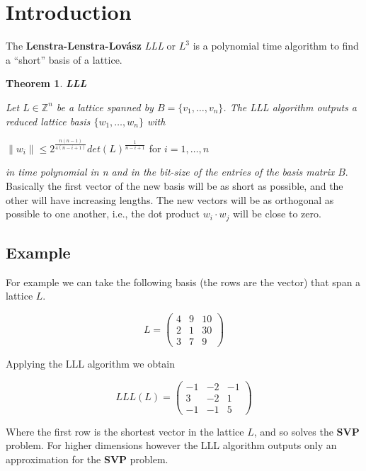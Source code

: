 \documentclass[a4paper,12pt]{report}
\newtheorem{theorem}{Theorem}[section]
\newcommand{\Z}{\mathbb{Z}}
\newcommand{\dd}{\cdot}
\begin{document}
\section{Introduction}

The \textbf{Lenstra-Lenstra-Lovász} \textit{LLL}\cite{LLL} or \textit{$L^3$} is a polynomial time algorithm to find a ``short'' basis of a lattice.

\begin{theorem}
    \textbf{LLL}
\end{theorem}

\textit{Let $L \in \Z^n$ be a lattice spanned by $B = \{v_1,\ldots,v_n\}$. The LLL algorithm outputs a reduced lattice
basis $\{w_1, \ldots, w_n\}$ with}

\begin{center}
    $\lVert w_i \rVert \le 2^{\frac{n(n-1)}{4(n-i+1)}} det(L)^{\frac{1}{n-i+1}}$ for $i=1,\ldots,n$
\end{center}

\textit{in time polynomial in n and in the bit-size of the entries of the basis matrix $B$}.\\

Basically the first vector of the new basis will be as short as possible, and the other will have increasing lengths. The new vectors
will be as orthogonal as possible to one another, i.e., the dot product $w_i \dd w_j$ will be close to zero.

\subsection*{Example}

For example we can take the following basis (the rows are the vector) that span
a lattice $L$.

\[
L = 
\begin{pmatrix}
    4 & 9 & 10\\
    2 & 1 & 30\\ 
    3 & 7 & 9
\end{pmatrix}
\] 

Applying the LLL algorithm we obtain

\[
LLL(L) = 
\begin{pmatrix}
    -1 & -2 & -1\\
     3 & -2 &  1\\
    -1 & -1 &  5
\end{pmatrix}
\] 

Where the first row is the shortest vector in the lattice $L$, and so solves the \textbf{SVP} problem.
For higher dimensions however the LLL algorithm outputs only an approximation for the \textbf{SVP} problem.
\end{document}
